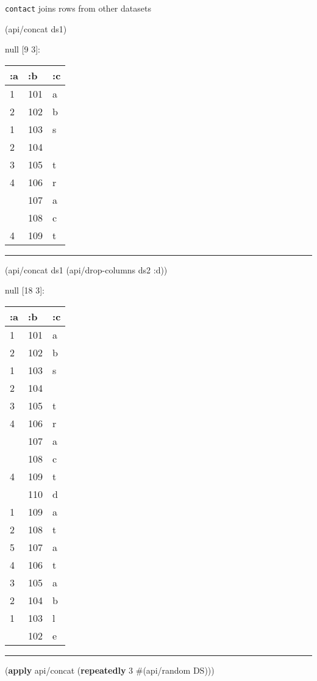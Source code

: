 \documentclass[]{article}
\newenvironment{Shaded}{\begin{snugshade}}{\end{snugshade}}
\newcommand{\KeywordTok}[1]{\textcolor[rgb]{0.13,0.29,0.53}{\textbf{#1}}}
\newcommand{\DecValTok}[1]{\textcolor[rgb]{0.00,0.00,0.81}{#1}}
\newcommand{\AttributeTok}[1]{\textcolor[rgb]{0.77,0.63,0.00}{#1}}
\newcommand{\NormalTok}[1]{#1}
\begin{document}
\texttt{contact} joins rows from other datasets

\begin{Shaded}
\begin{Highlighting}[]
\NormalTok{(api/concat ds1)}
\end{Highlighting}
\end{Shaded}

null {[}9 3{]}:

\begin{longtable}[]{@{}lll@{}}
\toprule
:a & :b & :c\tabularnewline
\midrule
\endhead
1 & 101 & a\tabularnewline
2 & 102 & b\tabularnewline
1 & 103 & s\tabularnewline
2 & 104 &\tabularnewline
3 & 105 & t\tabularnewline
4 & 106 & r\tabularnewline
& 107 & a\tabularnewline
& 108 & c\tabularnewline
4 & 109 & t\tabularnewline
\bottomrule
\end{longtable}

\begin{center}\rule{0.5\linewidth}{0.5pt}\end{center}

\begin{Shaded}
\begin{Highlighting}[]
\NormalTok{(api/concat ds1 (api/drop-columns ds2 }\AttributeTok{:d}\NormalTok{))}
\end{Highlighting}
\end{Shaded}

null {[}18 3{]}:

\begin{longtable}[]{@{}lll@{}}
\toprule
:a & :b & :c\tabularnewline
\midrule
\endhead
1 & 101 & a\tabularnewline
2 & 102 & b\tabularnewline
1 & 103 & s\tabularnewline
2 & 104 &\tabularnewline
3 & 105 & t\tabularnewline
4 & 106 & r\tabularnewline
& 107 & a\tabularnewline
& 108 & c\tabularnewline
4 & 109 & t\tabularnewline
& 110 & d\tabularnewline
1 & 109 & a\tabularnewline
2 & 108 & t\tabularnewline
5 & 107 & a\tabularnewline
4 & 106 & t\tabularnewline
3 & 105 & a\tabularnewline
2 & 104 & b\tabularnewline
1 & 103 & l\tabularnewline
& 102 & e\tabularnewline
\bottomrule
\end{longtable}

\begin{center}\rule{0.5\linewidth}{0.5pt}\end{center}

\begin{Shaded}
\begin{Highlighting}[]
\NormalTok{(}\KeywordTok{apply}\NormalTok{ api/concat (}\KeywordTok{repeatedly} \DecValTok{3}\NormalTok{ #(api/random DS)))}
\end{Highlighting}
\end{Shaded}
\end{document}
